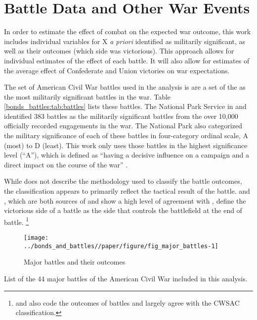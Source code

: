 \section{Battle Data and Other War Events}
\label{bonds_battles:sec:battle-data}

In order to estimate the effect of combat on the expected war outcome, this work includes individual variables for X \textit{a priori} identified as militarily significant, as well as their outcomes (which side was victorious).
This approach allows for individual estimates of the effect of each battle.
It will also allow for estimates of the average effect of Confederate and Union victories on war expectations.


The set of American Civil War battles used in the analysis is  are a set of the  \textcite{CWSAC1993} as the most militarily significant battles in the war.
Table \ref{bonds_battles:tab:battles} lists these battles.
The National Park Service in \textcite{CWSAC1993} and \textcite{CWSAC1993b} identified 383 battles as the militarily significant battles from the over 10,000 officially recorded engagements in the war.
The National Park also categorized the military significance of each of these battles in four-category ordinal scale, A (most) to D (least).
This work only uses those battles in the highest significance level (``A''), which is defined as ``having a decisive influence on a campaign and a direct impact on the course of the war'' \parencite{CWSAC1993}.

While \textcite{CWSAC1993} does not describe the methodology used to classify the battle outcomes, the classification appears to primarily reflect the tactical result of the battle.
\textcite{fox1898regimental} and \textcite{Livermore1900}, which are both sources of and show a high level of agreement with \textcite{CWSAC1993}, define the victorious side of a battle as the side that controls the battlefield at the end of battle.%
\footnote{\textcite{Bodart1908} and \textcite{cdb90} also code the outcomes of battles and largely agree with the CWSAC classification.} %

\begin{figure}[htpb]
  \centering
  \texttt{[image: ../bonds\_and\_battles//paper/figure/fig\_major\_battles-1]}
  \caption{Major battles and their outcomes}
  \label{bonds_battles:fig:major_battles}
\end{figure}

\begin{table}
  \centering
  
  \caption{List of the 44 major battles of the American Civil War included in this analysis.}
  \label{bonds_battles:tab:battles}
\end{table}


